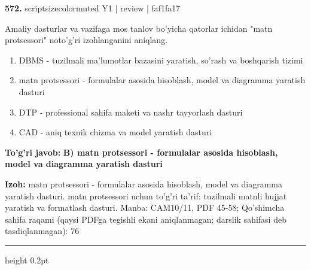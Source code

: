 \documentclass[10pt,a4paper]{article}
\begin{document}
{\bfseries\sffamily\color{ink} 572.} {scriptsizecolor{muted} Y1 | review | faf1fa17}
\par
Amaliy dasturlar va vazifaga mos tanlov bo'yicha qatorlar ichidan "matn protsessori" noto'g'ri izohlanganini aniqlang.
\begin{enumerate}[label=\Alph*),leftmargin=9mm]
\item DBMS - tuzilmali ma'lumotlar bazasini yaratish, so'rash va boshqarish tizimi
\item matn protsessori - formulalar asosida hisoblash, model va diagramma yaratish dasturi
\item DTP - professional sahifa maketi va nashr tayyorlash dasturi
\item CAD - aniq texnik chizma va model yaratish dasturi
\end{enumerate}
\begin{tcolorbox}[enhanced,breakable,colback=teal!4,colframe=teal!60!black,boxrule=0.45pt,arc=1.2mm,left=2.7mm,right=2.7mm,top=1.8mm,bottom=1.8mm,before skip=2mm,after skip=2mm]
{\bfseries\sffamily\color{teal}To'g'ri javob:} \textbf{B) matn protsessori - formulalar asosida hisoblash, model va diagramma yaratish dasturi}
\par\smallskip
{\bfseries Izoh:} matn protsessori - formulalar asosida hisoblash, model va diagramma yaratish dasturi. matn protsessori uchun to'g'ri ta'rif: tuzilmali matnli hujjat yaratish va formatlash dasturi. Manba: CAM10/11, PDF 45-58; Qo'shimcha sahifa raqami (qaysi PDFga tegishli ekani aniqlanmagan; darslik sahifasi deb tasdiqlanmagan): 76
\end{tcolorbox}
\vspace{2mm}\hrule height 0.2pt\vspace{3mm}
\end{document}
